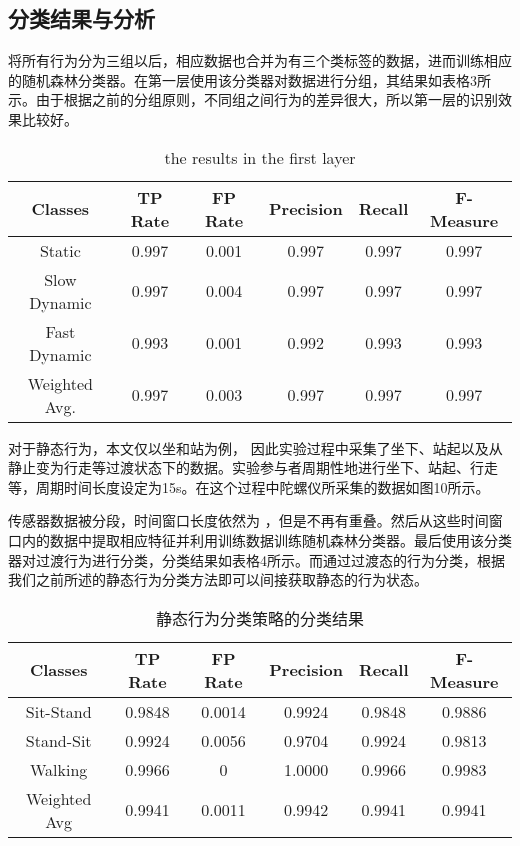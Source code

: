 \subsection{分类结果与分析}
\par 将所有行为分为三组以后，相应数据也合并为有三个类标签的数据，进而训练相应的随机森林分类器。在第一层使用该分类器对数据进行分组，其结果如表格3所示。由于根据之前的分组原则，不同组之间行为的差异很大，所以第一层的识别效果比较好。
    \begin{table}[!ht]
    \centering
    \caption{the results in the first layer}
    \begin{tabular}{cccccc}
    \toprule
    Classes & TP Rate & FP Rate & Precision & Recall & F-Measure \\
    \midrule
    Static & 0.997 & 0.001 & 0.997 & 0.997 & 0.997 \\
    Slow Dynamic & 0.997 & 0.004 & 0.997 & 0.997 & 0.997 \\
    Fast Dynamic & 0.993 & 0.001 & 0.992 & 0.993 & 0.993\\
    \hline
    Weighted Avg. & 0.997 & 0.003 & 0.997 & 0.997 & 0.997\\
    \bottomrule
    \end{tabular}
    \end{table}
\par 对于静态行为，本文仅以坐和站为例， 因此实验过程中采集了坐下、站起以及从静止变为行走等过渡状态下的数据。实验参与者周期性地进行坐下、站起、行走等，周期时间长度设定为15s。在这个过程中陀螺仪所采集的数据如图10所示。


\par 传感器数据被分段，时间窗口长度依然为 ，但是不再有重叠。然后从这些时间窗口内的数据中提取相应特征并利用训练数据训练随机森林分类器。最后使用该分类器对过渡行为进行分类，分类结果如表格4所示。而通过过渡态的行为分类，根据我们之前所述的静态行为分类方法即可以间接获取静态的行为状态。

\begin{table}[!ht]
    \centering
    \caption{静态行为分类策略的分类结果}
    \begin{tabular}{cccccc}
    \toprule
    Classes & TP Rate & FP Rate & Precision & Recall & F-Measure \\
    \midrule
    Sit-Stand & 0.9848 & 0.0014 & 0.9924 & 0.9848 & 0.9886\\
    Stand-Sit & 0.9924 & 0.0056 & 0.9704 & 0.9924 & 0.9813\\
    Walking & 0.9966 & 0 & 1.0000 & 0.9966 & 0.9983\\
    \hline
    Weighted Avg & 0.9941 & 0.0011 & 0.9942 & 0.9941 & 0.9941\\
    \bottomrule
    \end{tabular}
 \end{table}

